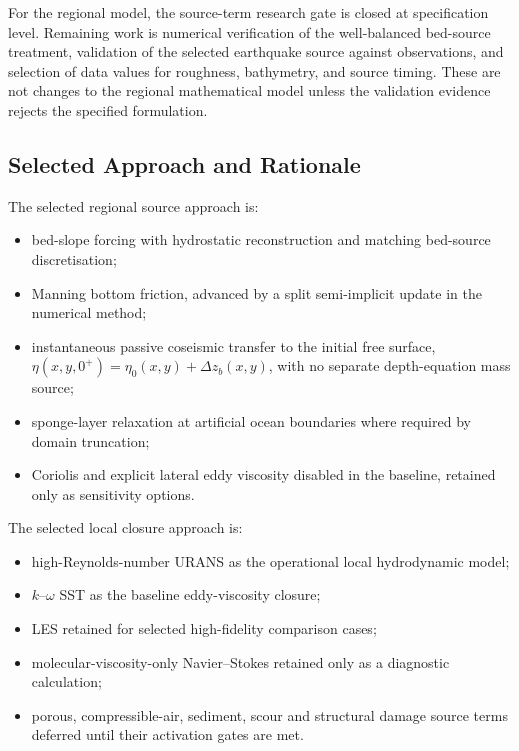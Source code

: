 
For the regional model, the source-term research gate is closed at
specification level. Remaining work is numerical verification of the
well-balanced bed-source treatment, validation of the selected
earthquake source against observations, and selection of data values for
roughness, bathymetry, and source timing. These are not changes to the
regional mathematical model unless the validation evidence rejects the
specified formulation.

\subsection{Selected Approach and Rationale}
\label{sec:res-mod-src-selected-approach}


The selected regional source approach is:

\begin{itemize}
  \item bed-slope forcing with hydrostatic reconstruction and matching
    bed-source discretisation;
  \item Manning bottom friction, advanced by a split semi-implicit
    update in the numerical method;
  \item instantaneous passive coseismic transfer to the initial free
    surface, $\eta(x,y,0^+)=\eta_0(x,y)+\Delta z_b(x,y)$, with no
    separate depth-equation mass source;
  \item sponge-layer relaxation at artificial ocean boundaries where
    required by domain truncation;
  \item Coriolis and explicit lateral eddy viscosity disabled in the
    baseline, retained only as sensitivity options.
\end{itemize}

The selected local closure approach is:

\begin{itemize}
  \item high-Reynolds-number URANS as the operational local
    hydrodynamic model;
  \item $k$--$\omega$ SST as the baseline eddy-viscosity closure;
  \item LES retained for selected high-fidelity comparison cases;
  \item molecular-viscosity-only Navier--Stokes retained only as a
    diagnostic calculation;
  \item porous, compressible-air, sediment, scour and structural
    damage source terms deferred until their activation gates are met.
\end{itemize}

